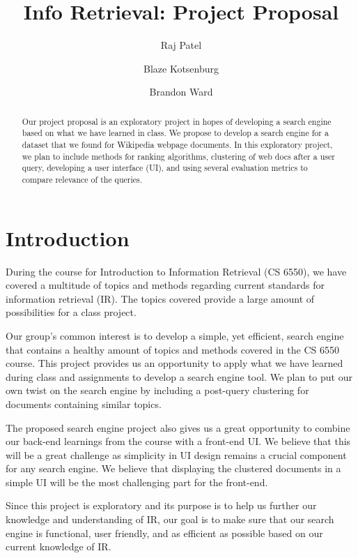 \documentclass[sigconf]{acmart}
\begin{document}
\title{Info Retrieval: Project Proposal}

\author{Raj Patel}

\author{Blaze Kotsenburg}

\author{Brandon Ward}

\begin{abstract}
  Our project proposal is an exploratory project in hopes of developing a search engine based on what we have learned in class. We propose to develop a search engine for a dataset that we found for Wikipedia webpage documents. In this exploratory project, we plan to include methods for ranking algorithms, clustering of web docs after a user query, developing a user interface (UI), and using several evaluation metrics to compare relevance of the queries.
\end{abstract}


\maketitle

\section{Introduction}
During the course for Introduction to Information Retrieval (CS 6550), we have covered a multitude of topics and methods regarding current standards for information retrieval (IR). The topics covered provide a large amount of possibilities for a class project.

Our group’s common interest is to develop a simple, yet efficient, search engine that contains a healthy amount of topics and methods covered in the CS 6550 course. This project provides us an opportunity to apply what we have learned during class and assignments to develop a search engine tool. We plan to put our own twist on the search engine by including a post-query clustering for documents containing similar topics.

The proposed search engine project also gives us a great opportunity to combine our back-end learnings from the course with a front-end UI. We believe that this will be a great challenge as simplicity in UI design remains a crucial component for any search engine. We believe that displaying the clustered documents in a simple UI will be the most challenging part for the front-end. 

Since this project is exploratory and its purpose is to help us further our knowledge and understanding of IR, our goal is to make sure that our search engine is functional, user friendly, and as efficient as possible based on our current knowledge of IR.
\end{document}
